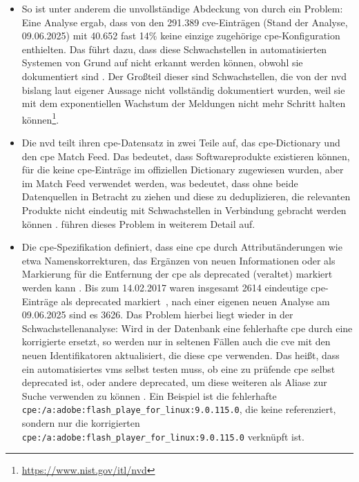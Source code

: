 \begin{itemize}
    \item So ist unter anderem die unvollständige Abdeckung von  durch  ein Problem:
    Eine Analyse ergab, dass von den 291.389 \acrshort{cve}-Einträgen (Stand der Analyse, 09.06.2025) mit 40.652 fast 14\% keine einzige zugehörige \acrshort{cpe}-Konfiguration enthielten.
    Das führt dazu, dass diese Schwachstellen in automatisierten Systemen von Grund auf nicht erkannt werden können, obwohl sie dokumentiert sind \autocite{Sanguino_Uetz_2017}.
    Der Großteil dieser  sind Schwachstellen, die von der \acrshort{nvd} bislang laut eigener Aussage nicht vollständig dokumentiert wurden, weil sie mit dem exponentiellen Wachstum der Meldungen nicht mehr Schritt halten können\footnote{\url{https://www.nist.gov/itl/nvd}}.

    \item Die \acrshort{nvd} teilt ihren \acrshort{cpe}-Datensatz in zwei Teile auf, das \acrshort{cpe}-Dictionary \autocite{Cichonski_Waltermire_Scarfone_2011} und den \acrshort{cpe} Match Feed.
    Das bedeutet, dass Softwareprodukte existieren können, für die keine \acrshort{cpe}-Einträge im offiziellen Dictionary zugewiesen wurden, aber im Match Feed verwendet werden, was bedeutet, dass ohne beide Datenquellen in Betracht zu ziehen und diese zu deduplizieren, die relevanten Produkte nicht eindeutig mit Schwachstellen in Verbindung gebracht werden können \autocite{Sanguino_Uetz_2017}.
    \textcite{Sanguino_Uetz_2017} führen dieses Problem in weiterem Detail auf.

    \item Die \acrshort{cpe}-Spezifikation definiert, dass eine \acrshort{cpe} durch Attributänderungen wie etwa Namenskorrekturen, das Ergänzen von neuen Informationen oder als Markierung für die Entfernung der \acrshort{cpe} als deprecated (veraltet) markiert werden kann \autocite{Cichonski_Waltermire_Scarfone_2011}.
    Bis zum 14.02.2017 waren insgesamt 2614 eindeutige \acrshort{cpe}-Einträge als deprecated markiert\ \autocite{Sanguino_Uetz_2017}, nach einer eigenen neuen Analyse am 09.06.2025 sind es 3626.
    Das Problem hierbei liegt wieder in der Schwachstellenanalyse:
    Wird in der Datenbank eine fehlerhafte \acrshort{cpe} durch eine korrigierte ersetzt, so werden nur in seltenen Fällen auch die \acrshort{cve} mit den neuen Identifikatoren aktualisiert, die diese \acrshort{cpe} verwenden.
    Das heißt, dass ein automatisiertes \acrshort{vms} selbst testen muss, ob eine zu prüfende \acrshort{cpe} selbst deprecated ist, oder andere deprecated, um diese weiteren  als Aliase zur Suche verwenden zu können \autocite{Sanguino_Uetz_2017}.
    Ein Beispiel ist die fehlerhafte \texttt{cpe:/a:adobe:flash\_playe\_for\_linux:9.0.115.0}, die keine  referenziert, sondern nur die korrigierten \texttt{cpe:/a:adobe:flash\_playe\textit{r}\_for\_linux:9.0.115.0} verknüpft ist.


\end{itemize}
